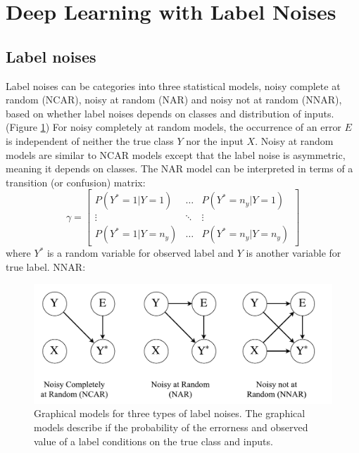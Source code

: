 


\section{Deep Learning with Label Noises}


\subsection{Label noises}
Label noises can be categories into three statistical models, noisy complete at random (NCAR), noisy at random (NAR) and noisy not at random (NNAR), based on whether label noises depends on classes and distribution of inputs. (Figure \ref{fig:noises})
For noisy completely at random models, the occurrence of an error $E$ is independent of neither the true class $Y$ nor the input $X$.
Noisy at random models are similar to NCAR models except that the label noise is asymmetric, meaning it depends on classes.
The NAR model can be interpreted in terms of a transition (or confusion) matrix:
\[
\gamma =
\begin{bmatrix}
    P(Y^{\ast}=1\vert Y=1)   & \dots  & P(Y^{\ast}=n_y\vert Y=1) \\
    \vdots                   & \ddots & \vdots \\
    P(Y^{\ast}=1\vert Y=n_y) & \dots  & P(Y^{\ast}=n_y\vert Y=n_y)
\end{bmatrix}
\]
where $Y^{\ast}$ is a random variable for observed label and $Y$ is another variable for true label.
NNAR:

\begin{figure}[t]
\begin{center}
   \includegraphics[width=1.05\linewidth]{img/label_noises}
\end{center}
   \caption{
   Graphical models for three types of label noises. \cite{frenay2014classification}
   The graphical models describe if the probability of the errorness and observed value of a label conditions on the true class and inputs.
   }
\label{fig:noises}
\end{figure}
